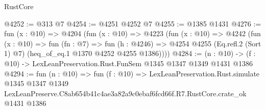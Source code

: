 \begin{lexlean}{RustCore}
\begin{coremodule}
@4252 := @313 @7
@4254 := @4251 @4252 @7
@4255 := @1385 @1431
@4276 := fun (x : @10) =>
  @4204
    (fun (x : @10) =>
    @4223
      (fun (x : @10) =>
      @4242
        (fun (x : @10) =>
        fun (fn : @7) =>
        fun (h : @4246) =>
        @4254 @4255 (Eq.refl.{2} (Sort 1) @7) (heq_of_eq.{1} @1370 @4252 @4255 @1386))))
@4284 := (n : @10) -> (f : @10) -> LexLeanPreservation.Rust.FunSem @1345 @1347 @1349 @1431 @1386
@4294 := fun (n : @10) =>
  fun (f : @10) =>
  LexLeanPreservation.Rust.simulate
    @1345
    @1347
    @1349
    LexLeanPreserve.C8ab654b41c4ae3a82a9c0ebaf6fcd66f.R7.RustCore.crate_ok
    @1431
    @1386
\end{coremodule}
\end{lexlean}
